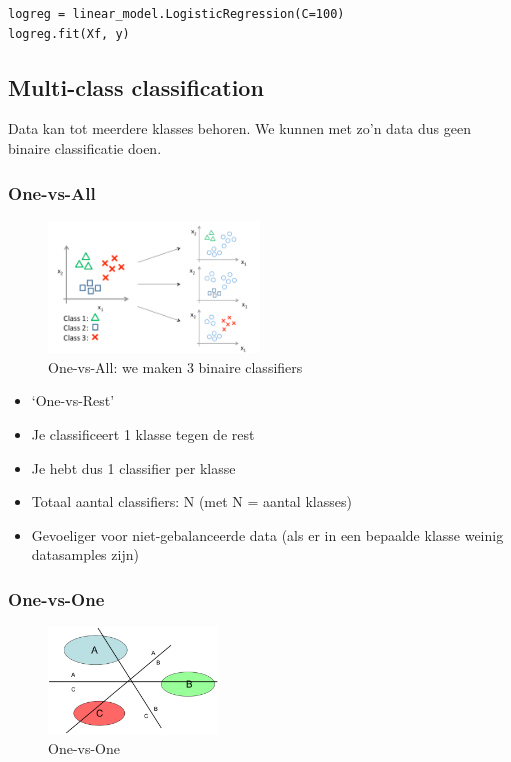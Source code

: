 \documentclass{article}
\begin{document}
\begin{verbatim}
logreg = linear_model.LogisticRegression(C=100)
logreg.fit(Xf, y)
\end{verbatim}

\subsection{Multi-class classification}

Data kan tot meerdere klasses behoren.
We kunnen met zo'n data dus geen binaire classificatie doen.


\subsubsection{One-vs-All}

\begin{figure}[H]
    \centering
    \includegraphics[width=0.5\textwidth]{multi-class-classification.png}
    \caption{One-vs-All: we maken 3 binaire classifiers}
\end{figure}


\begin{itemize}
    \item `One-vs-Rest'
    \item Je classificeert 1 klasse tegen de rest
    \item Je hebt dus 1 classifier per klasse
    \item Totaal aantal classifiers: N (met N = aantal klasses)
    \item Gevoeliger voor niet-gebalanceerde data (als er in een bepaalde klasse weinig datasamples zijn)
\end{itemize}

\subsubsection{One-vs-One}

\begin{figure}[H]
    \centering
    \includegraphics[width=0.4\textwidth]{multi-class-classification2.png}
    \caption{One-vs-One}
\end{figure}
\end{document}
